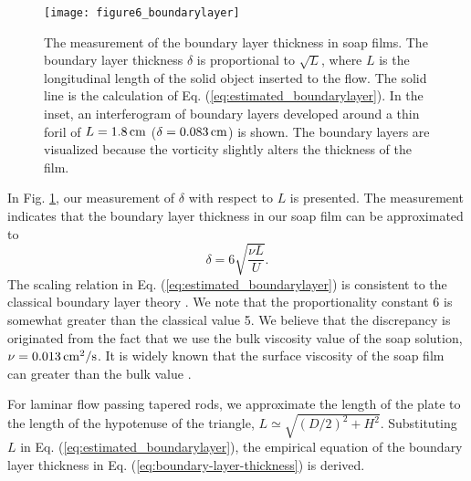 \documentclass[english, aps, prl, longbibliography, preprint]{revtex4-1}
\newcommand\citepar\citep
\begin{document}
\begin{figure}
\begin{centering}
\texttt{[image: figure6\_boundarylayer]}
\par
\end{centering}
\caption{
The measurement of the boundary layer thickness in soap films.
The boundary layer thickness $\delta$ is proportional to $\sqrt{L}$, where $L$ is the longitudinal length of the solid object inserted to the flow.
The solid line is the calculation of Eq. (\ref{eq:estimated_boundarylayer}).
In the inset, an interferogram of boundary layers developed around a thin foril of $L=1.8\,\rm cm$ ($\delta=0.083\,\rm cm$) is shown.
The boundary layers are visualized because the vorticity slightly alters the thickness of the film.
\label{fig:boundarylayer}}
\end{figure}

In Fig. \ref{fig:boundarylayer}, our measurement of $\delta$ with respect to $L$ is presented.
The measurement indicates that the boundary layer thickness in our soap film can be approximated to
\begin{equation}
\delta=6\sqrt{\frac{\nu L}{U}}.
\label{eq:estimated_boundarylayer}
\end{equation}
The scaling relation in Eq. (\ref{eq:estimated_boundarylayer}) is consistent to the classical boundary layer theory \citepar{Schlichting}.
We note that the proportionality constant 6 is somewhat greater than the classical value 5.
We believe that the discrepancy is originated from the fact that we use the bulk viscosity value of the soap solution, $\nu=0.013 \,\rm cm^2/s$. 
It is widely known that the surface viscosity of the soap film can greater than the bulk value \citepar{Martin-rsi-95, Vorobieff:1999wn, Prasad:2009jj, Vivek2015}.

For laminar flow passing tapered rods, we approximate the length of the plate to the length of the hypotenuse of the triangle, $L\simeq\sqrt{\left(D/2\right)^{2}+H^{2}}$.
Substituting $L$ in Eq. (\ref{eq:estimated_boundarylayer}), the empirical equation of the boundary layer thickness in Eq. (\ref{eq:boundary-layer-thickness}) is derived.




\end{document}
